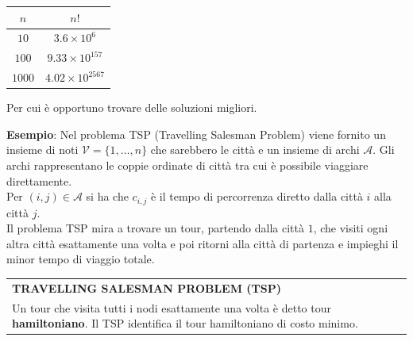\documentclass[a4paper]{extarticle}
\renewcommand\arraystretch{}
\begin{document}
\vspace{1em}
\noindent
\begin{table}[H]
    \setlength{\tabcolsep}{8pt}
    \renewcommand{\arraystretch}{1.5}
    \noindent
    \centering
    \begin{tabular}{c|c}
       $n$ & $n!$\\
       \hline
       $10$   & $3.6 \times 10^6$\\
       $100$  & $9.33 \times 10^{157}$\\
       $1000$ & $4.02 \times 10^{2567}$\\
    \end{tabular}
\end{table}
Per cui è opportuno trovare delle soluzioni migliori.

\vspace{2em}
\noindent
\textbf{Esempio}: Nel problema TSP (Travelling Salesman Problem) viene fornito un insieme di noti $\mathcal{V} = \{1,\dots,n\}$ che sarebbero le città e un insieme di archi $\mathcal{A}$. Gli archi rappresentano le coppie ordinate di città tra cui è possibile viaggiare direttamente.\\
Per $(i,j) \in \mathcal{A}$ si ha che $c_{i,j}$ è il tempo di percorrenza diretto dalla città $i$ alla città $j$.\\
Il problema TSP mira a trovare un tour, partendo dalla città $1$, che visiti ogni altra città esattamente una volta e poi ritorni alla città di partenza e impieghi il minor tempo di viaggio totale.

\vspace{1em}
\setlength{\tabcolsep}{14pt}
\renewcommand{\arraystretch}{2}
\noindent
\begin{tabularx}{\textwidth}{@{}|P|@{}}
    \hline
    {\textbf{TRAVELLING SALESMAN PROBLEM (TSP)}}\\
    \parbox{\linewidth}{Un tour che visita tutti i nodi esattamente una volta è detto tour \textbf{hamiltoniano}. Il TSP identifica il tour hamiltoniano di costo minimo. \vspace{3mm}}\\
    \hline
\end{tabularx}

\vspace{1em}
\noindent
\end{document}
